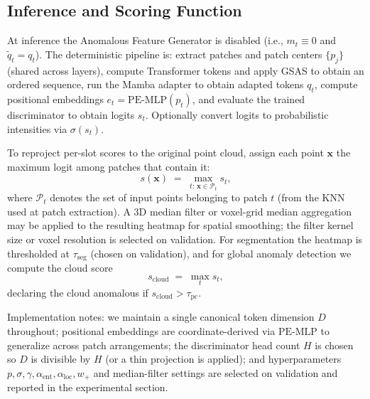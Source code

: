 \subsection{Inference and Scoring Function}

At inference the Anomalous Feature Generator is disabled (i.e., \(m_t\equiv 0\) and \(\tilde{q}_t=q_t\)). The deterministic pipeline is: extract patches and patch centers \(\{p_j\}\) (shared across layers), compute Transformer tokens and apply GSAS to obtain an ordered sequence, run the Mamba adapter to obtain adapted tokens \(q_t\), compute positional embeddings \(e_t=\mathrm{PE\text{-}MLP}(p_t)\), and evaluate the trained discriminator to obtain logits \(s_t\). Optionally convert logits to probabilistic intensities via \(\sigma(s_t)\).

To reproject per-slot scores to the original point cloud, assign each point \(\mathbf{x}\) the maximum logit among patches that contain it:
\begin{equation}
s(\mathbf{x}) \;=\; \max_{t:\,\mathbf{x}\in\mathcal{P}_t} s_t,
\end{equation}
where \(\mathcal{P}_t\) denotes the set of input points belonging to patch \(t\) (from the KNN used at patch extraction). A 3D median filter or voxel-grid median aggregation may be applied to the resulting heatmap for spatial smoothing; the filter kernel size or voxel resolution is selected on validation. For segmentation the heatmap is thresholded at \(\tau_{\mathrm{seg}}\) (chosen on validation), and for global anomaly detection we compute the cloud score
\begin{equation}
s_{\mathrm{cloud}} \;=\; \max_{t} s_t,
\end{equation}
declaring the cloud anomalous if \(s_{\mathrm{cloud}}>\tau_{\mathrm{pc}}\).

Implementation notes: we maintain a single canonical token dimension \(D\) throughout; positional embeddings are coordinate-derived via \(\mathrm{PE\text{-}MLP}\) to generalize across patch arrangements; the discriminator head count \(H\) is chosen so \(D\) is divisible by \(H\) (or a thin projection is applied); and hyperparameters \(p,\sigma,\gamma,\alpha_{\mathrm{ent}},\alpha_{\mathrm{loc}},w_+\) and median-filter settings are selected on validation and reported in the experimental section.
